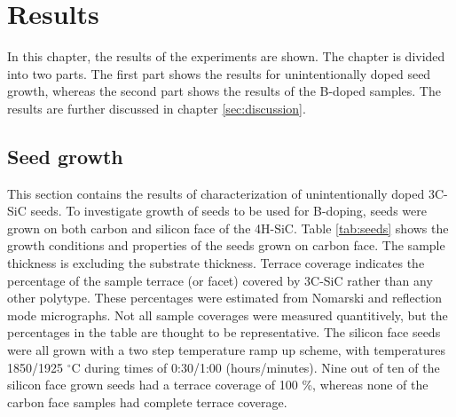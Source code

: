 

	
	

	
	

\chapter{Results}
\label{sec:results}
In this chapter, the results of the experiments are shown. The chapter is divided into two parts. The first part shows the results for unintentionally doped seed growth, whereas the second part shows the results of the B-doped samples. The results are further discussed in chapter \ref{sec:discussion}. 

\section{Seed growth}
\label{sec:results:seeds}
This section contains the results of characterization of unintentionally doped 3C-SiC seeds. To investigate growth of seeds to be used for B-doping, seeds were grown on both carbon and silicon face of the 4H-SiC. Table \ref{tab:seeds} shows the growth conditions and properties of the seeds grown on carbon face. The sample thickness is excluding the substrate thickness. Terrace coverage indicates the percentage of the sample terrace (or facet) covered by 3C-SiC rather than any other polytype. These percentages were estimated from Nomarski and reflection mode micrographs. Not all sample coverages were measured quantitively, but the percentages in the table are thought to be representative. The silicon face seeds were all grown with a two step temperature ramp up scheme, with temperatures 1850/1925 $^\circ$C during times of 0:30/1:00 (hours/minutes). Nine out of ten of the silicon face grown seeds had a terrace coverage of 100 \%, whereas none of the carbon face samples had complete terrace coverage. 

